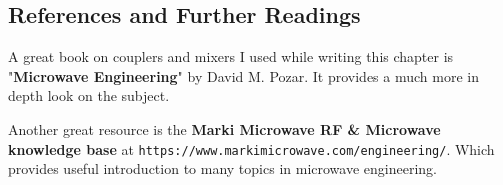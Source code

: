 \subsection{References and Further Readings}
A great book on couplers and mixers I used while writing this chapter is "\textbf{Microwave Engineering}" by David M. Pozar. It provides a much more in depth look on the subject.

Another great resource is the \textbf{Marki Microwave RF \& Microwave knowledge base} at \newline \texttt{https://www.markimicrowave.com/engineering/}. Which provides useful introduction to many topics in microwave engineering.